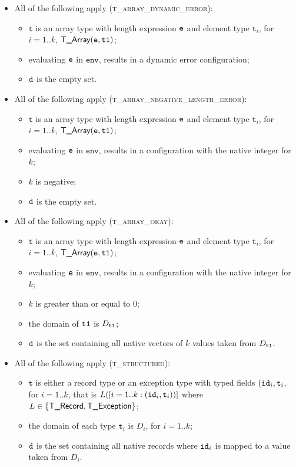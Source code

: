\documentclass{book}
\newcommand\env[0]{\texttt{env}}
\newcommand\vt[0]{\texttt{t}}
\begin{document}
\begin{itemize}
  \item All of the following apply (\textsc{t\_array\_dynamic\_error}):
  \begin{itemize}
    \item $\vt$ is an array type with length expression $\texttt{e}$ and element type $\vt_i$, for $i=1..k$, $\textsf{T\_Array}(\texttt{e}, \texttt{t1})$;
    \item evaluating $\texttt{e}$ in $\env$, results in a dynamic error configuration;
    \item $\texttt{d}$ is the empty set.
  \end{itemize}

  \item All of the following apply (\textsc{t\_array\_negative\_length\_error}):
  \begin{itemize}
    \item $\vt$ is an array type with length expression $\texttt{e}$ and element type $\vt_i$, for $i=1..k$, $\textsf{T\_Array}(\texttt{e}, \texttt{t1})$;
    \item evaluating $\texttt{e}$ in $\env$, results in a configuration with the native integer for $k$;
    \item $k$ is negative;
    \item $\texttt{d}$ is the empty set.
  \end{itemize}

  \item All of the following apply (\textsc{t\_array\_okay}):
  \begin{itemize}
    \item $\vt$ is an array type with length expression $\texttt{e}$ and element type $\vt_i$, for $i=1..k$, $\textsf{T\_Array}(\texttt{e}, \texttt{t1})$;
    \item evaluating $\texttt{e}$ in $\env$, results in a configuration with the native integer for $k$;
    \item $k$ is greater than or equal to $0$;
    \item the domain of $\texttt{t1}$ is $D_{\texttt{t1}}$;
    \item $\texttt{d}$ is the set containing all native vectors of $k$ values taken from $D_{\texttt{t1}}$.
  \end{itemize}

  \item All of the following apply (\textsc{t\_structured}):
  \begin{itemize}
    \item $\vt$ is either a record type or an exception type with typed fields $(\id_i, \vt_i$, for $i=1..k$, that is $L([i=1..k: (\id_i,\vt_i))]$
    where $L\in\{\textsf{T\_Record}, \textsf{T\_Exception}\}$;
    \item the domain of each type $\vt_i$ is $D_i$, for $i=1..k$;
    \item $\texttt{d}$ is the set containing all native records where $\texttt{id}_i$ is mapped to a value taken from $D_i$.
  \end{itemize}


\end{itemize}
\end{document}
